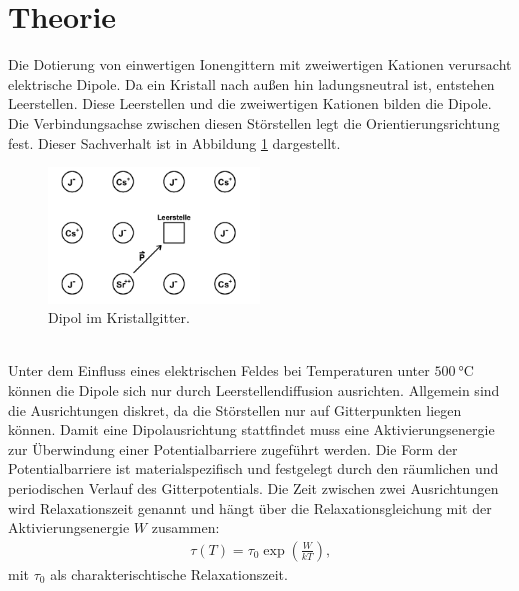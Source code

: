 \section{Theorie}
\label{sec:Theorie}
Die Dotierung von einwertigen Ionengittern mit zweiwertigen Kationen verursacht elektrische Dipole.
Da ein Kristall nach außen hin ladungsneutral ist, entstehen Leerstellen. Diese Leerstellen und die zweiwertigen
Kationen bilden die Dipole. Die Verbindungsachse zwischen diesen Störstellen legt die Orientierungsrichtung
fest. Dieser Sachverhalt ist in Abbildung \ref{fig:kristall} dargestellt.
\begin{figure}
    \centering
    \includegraphics[width=0.5\textwidth]{kristall.PNG}
    \caption{Dipol im Kristallgitter.\cite{skript}}
    \label{fig:kristall}
\end{figure}\\
Unter dem Einfluss eines elektrischen Feldes bei Temperaturen unter $500\ \si{\celsius}$ können die Dipole
sich nur durch Leerstellendiffusion ausrichten. Allgemein sind die Ausrichtungen diskret, da die Störstellen
nur auf Gitterpunkten liegen können. Damit eine Dipolausrichtung stattfindet muss eine Aktivierungsenergie
zur Überwindung einer Potentialbarriere zugeführt werden.
Die Form der Potentialbarriere ist materialspezifisch und festgelegt durch den räumlichen und periodischen
Verlauf des Gitterpotentials. Die Zeit zwischen zwei Ausrichtungen wird Relaxationszeit genannt und hängt über
die Relaxationsgleichung mit der Aktivierungsenergie $W$ zusammen:
\begin{align}
 \tau(T) =\tau_\mathrm{0}\exp\left({\frac{W}{kT}}\right) \label{eqn:relaxationsgleichung}\text{,}
\end{align}
mit $\tau_\mathrm{0}$ als charakterischtische Relaxationszeit.

